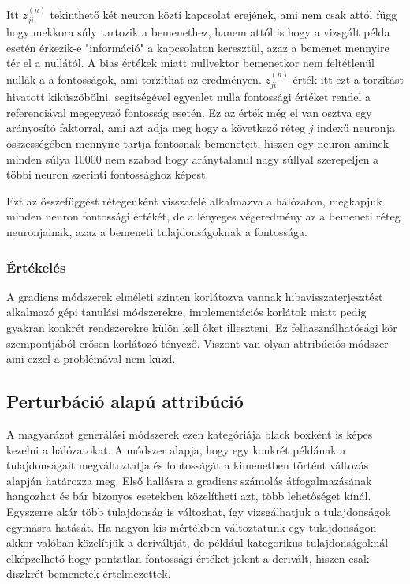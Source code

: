Itt ${z}_{ji}^{(n)}$ tekinthető két neuron közti kapcsolat erejének, ami nem csak attól függ hogy mekkora súly tartozik a bemenethez, hanem attól is hogy a vizsgált példa esetén érkezik-e "információ" a kapcsolaton keresztül, azaz a bemenet mennyire tér el a nullától. A bias értékek miatt nullvektor bemenetkor nem feltétlenül nullák a a fontosságok, ami torzíthat az eredményen. $\bar{z}_{ji}^{(n)}$ érték itt ezt a torzítást hivatott kiküszöbölni, segítségével  egyenlet nulla fontossági értéket rendel a referenciával megegyező fontosság esetén. Ez az érték még el van osztva egy arányosító faktorral, ami azt adja meg hogy a következő réteg $j$ indexű neuronja összességében mennyire tartja fontosnak bemeneteit, hiszen egy neuron aminek minden súlya 10000 nem szabad hogy aránytalanul nagy súllyal szerepeljen a többi neuron szerinti fontossághoz képest.

Ezt az összefüggést rétegenként visszafelé alkalmazva a hálózaton, megkapjuk minden neuron fontossági értékét, de a lényeges végeredmény az a bemeneti réteg neuronjainak, azaz a bemeneti tulajdonságoknak a fontossága. 

\subsubsection{Értékelés}
A gradiens módszerek elméleti szinten korlátozva vannak hibavisszaterjesztést alkalmazó gépi tanulási módszerekre, implementációs korlátok miatt pedig gyakran konkrét rendszerekre külön kell őket illeszteni. Ez felhasználhatósági kör szempontjából erősen korlátozó tényező. Viszont van olyan attribúciós módszer ami ezzel a problémával nem küzd.

\subsection{Perturbáció alapú attribúció}

A magyarázat generálási módszerek ezen kategóriája black boxként is képes kezelni a hálózatokat. A módszer alapja, hogy egy konkrét példának a tulajdonságait megváltoztatja és fontosságát a kimenetben történt változás alapján határozza meg. Első hallásra a gradiens számolás átfogalmazásának  hangozhat és bár bizonyos esetekben közelítheti azt, több lehetőséget kínál. Egyszerre akár több tulajdonság is változhat, így vizsgálhatjuk a tulajdonságok egymásra hatását. Ha nagyon kis mértékben változtatunk egy tulajdonságon akkor valóban közelítjük a deriváltját, de például kategorikus tulajdonságoknál elképzelhető hogy pontatlan fontossági értéket jelent a derivált, hiszen csak diszkrét bemenetek értelmezettek.

